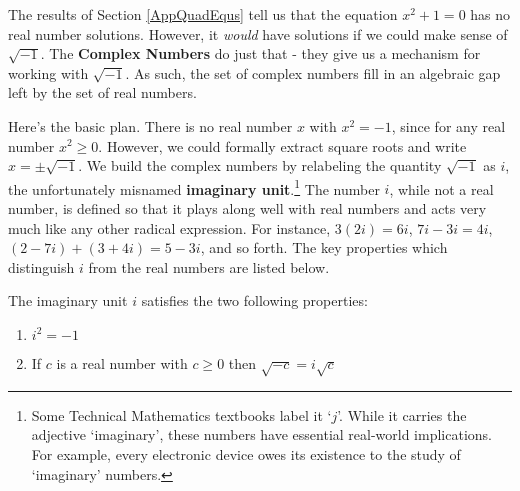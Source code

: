 \documentclass{ximera}
\begin{document}
	\author{Stitz-Zeager}




\setcounter{footnote}{0}

\label{AppCmpNums}

The results of Section \ref{AppQuadEqus} tell us that the equation $x^{2} + 1 = 0$ has no real number solutions. However, it \emph{would} have solutions if we could make sense of $\sqrt{-1}$. The \textbf{Complex Numbers} do just that - they give us a mechanism for working with $\sqrt{-1}$.  As such, the set of complex numbers fill in an algebraic gap left by the set of real numbers.  

\smallskip

Here's the basic plan.  There is no real number $x$ with $x^2 = -1$, since for any real number $x^2 \geq 0$.  However, we could formally extract square roots and write $x = \pm \sqrt{-1}$.  We build the complex numbers by relabeling the quantity $\sqrt{-1}$ as $i$, the unfortunately misnamed \textbf{imaginary unit}.\footnote{Some Technical Mathematics textbooks label it `$j$'.  While it carries the adjective `imaginary', these numbers have essential real-world implications.  For example, every electronic device owes its existence to the study of `imaginary' numbers.}  The number $i$, while not a real number, is defined so that it plays along well with real numbers and acts very much like any other radical expression.  For instance, $3(2i) = 6i$, $7i-3i = 4i$, $(2-7i) + (3 + 4i) = 5-3i$, and so forth.  The key properties which distinguish $i$ from the real numbers are listed below.

\medskip

\colorbox{ResultColor}{\bbm
\begin{defn} \label{idefn} The imaginary unit $i$ satisfies the two following properties:

\begin{enumerate}

\item  $i^2 = -1$

\item  If $c$ is a real number with $c \geq 0$ then $\sqrt{-c} = i \sqrt{c}$

\end{enumerate}

\end{defn}
\ebm}
\end{document}
